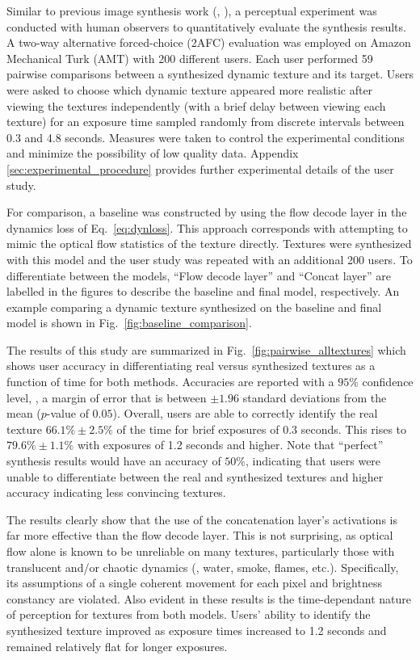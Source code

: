 Similar to previous image synthesis work (\eg, \cite{chen2017}), 
a perceptual experiment was conducted with human observers to 
quantitatively evaluate the synthesis results.
A two-way alternative forced-choice (2AFC) evaluation was employed on Amazon Mechanical
Turk (AMT) with 200 different users. Each user performed 59
pairwise comparisons between a synthesized dynamic texture and 
its target.
Users were asked to choose which dynamic texture appeared more realistic
after viewing the textures independently (with a brief delay between viewing each texture) for an exposure time sampled
randomly from discrete intervals between 0.3 and 4.8 seconds.
Measures were taken to control the experimental conditions and
minimize the possibility of low quality data.
Appendix \ref{sec:experimental_procedure} provides further experimental
details of the user study.

For comparison, a baseline was constructed by using the 
flow decode layer in the dynamics loss of Eq.\ \ref{eq:dynloss}.
This approach corresponds with attempting to mimic the optical flow 
statistics of the texture directly.
Textures were synthesized with this model and the user study
was repeated with an additional 200 users.
To differentiate between the models, ``Flow decode layer'' 
and ``Concat layer'' are labelled in the figures to describe the
baseline and final model, respectively. An example comparing a dynamic texture synthesized on the baseline and final model is shown in Fig.\ \ref{fig:baseline_comparison}.



The results of this study are summarized in
Fig.\ \ref{fig:pairwise_alltextures} which shows user accuracy in
differentiating real versus synthesized textures as a function of
time for both methods. Accuracies are reported with a $95\%$ confidence level, \ie, a margin of error that is between $\pm 1.96$ standard deviations from the mean ($p$-value of $0.05$).
Overall, users are able to correctly identify the real texture
$66.1\% \pm 2.5\%$ of the time for brief 
exposures of 0.3 seconds.
This rises to $79.6\% \pm 1.1\%$ with exposures of 1.2 seconds 
and higher.
Note that ``perfect'' synthesis results would have an accuracy
of $50\%$, indicating that users were unable to differentiate 
between the real and synthesized textures and higher accuracy 
indicating less convincing textures.



The results clearly show that the use of the concatenation 
layer's activations is far more effective than the flow decode 
layer.
This is not surprising, as optical flow alone is known to be 
unreliable on many textures, particularly those with
translucent and/or chaotic dynamics (\eg, water, smoke, flames, etc.). Specifically, its assumptions of a single coherent movement for each pixel and brightness constancy are violated.
Also evident in these results is the time-dependant nature of 
perception for textures from both models.
Users' ability to identify the synthesized texture improved as 
exposure times increased to 1.2 seconds and remained relatively 
flat for longer exposures.

